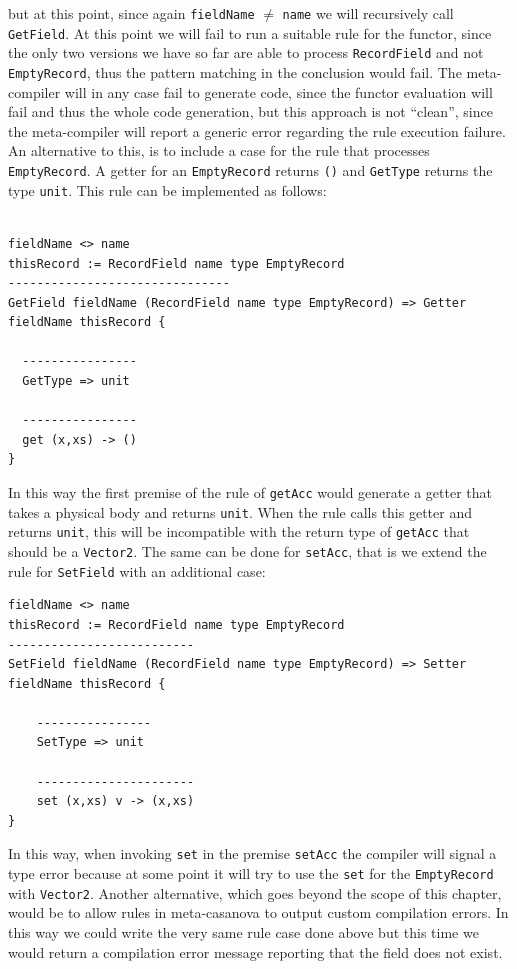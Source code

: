 \noindent
but at this point, since again \texttt{fieldName} $\neq$ \texttt{name} we will recursively call \texttt{GetField}. At this point we will fail to run a suitable rule for the functor, since the only two versions we have so far are able to process \texttt{RecordField} and not \texttt{EmptyRecord}, thus the pattern matching in the conclusion would fail. The meta-compiler will in any case fail to generate code, since the functor evaluation will fail and thus the whole code generation, but this approach is not ``clean'', since the meta-compiler will report a generic error regarding the rule execution failure. An alternative to this, is to include a case for the rule that processes \texttt{EmptyRecord}. A getter for an \texttt{EmptyRecord} returns \texttt{()} and \texttt{GetType} returns the type \texttt{unit}. This rule can be implemented as follows:

\begin{lstlisting}

fieldName <> name
thisRecord := RecordField name type EmptyRecord
-------------------------------
GetField fieldName (RecordField name type EmptyRecord) => Getter fieldName thisRecord {
	
  ----------------
  GetType => unit
  
  ----------------
  get (x,xs) -> ()
}
\end{lstlisting}

In this way the first premise of the rule of \texttt{getAcc} would generate a getter that takes a physical body and returns \texttt{unit}. When the rule calls this getter and returns \texttt{unit}, this will be incompatible with the return type of \texttt{getAcc} that should be a \texttt{Vector2}. The same can be done for \texttt{setAcc}, that is we extend the rule for \texttt{SetField} with an additional case:

\begin{lstlisting}
fieldName <> name
thisRecord := RecordField name type EmptyRecord
--------------------------
SetField fieldName (RecordField name type EmptyRecord) => Setter fieldName thisRecord {
	
	----------------
	SetType => unit
	
	----------------------
	set (x,xs) v -> (x,xs)
}
\end{lstlisting}

\noindent
In this way, when invoking \texttt{set} in the premise \texttt{setAcc} the compiler will signal a type error because at some point it will try to use the \texttt{set} for the \texttt{EmptyRecord} with \texttt{Vector2}. Another alternative, which goes beyond the scope of this chapter, would be to allow rules in meta-casanova to output custom compilation errors. In this way we could write the very same rule case done above but this time we would return a compilation error message reporting that the field does not exist.


